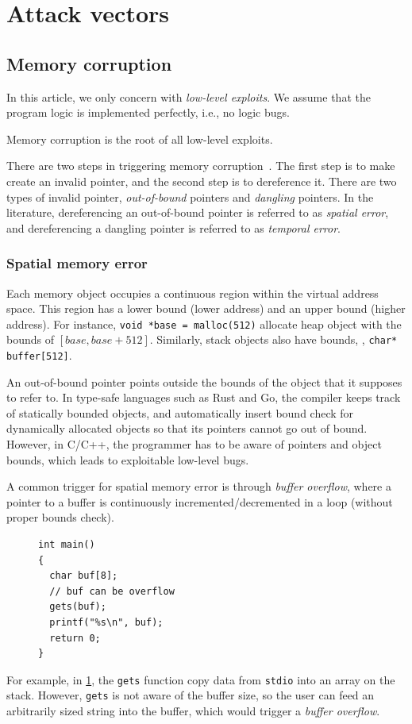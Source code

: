 \documentclass[11pt]{memoir}
\begin{document}
\section{Attack vectors}
\subsection{Memory corruption}
In this article, we only concern with \emph{low-level exploits}. 
We assume that the program logic is implemented perfectly, i.e., no logic bugs.

Memory corruption is the root of all low-level exploits.

There are two steps in triggering memory corruption~\cite{szekeres2013sok}. 
The first step is to make create an invalid pointer, and the second step is to
dereference it. There are two types of invalid pointer, \emph{out-of-bound}
pointers and \emph{dangling} pointers.
In the literature, dereferencing an out-of-bound pointer is referred to as
\emph{spatial error}, and dereferencing a dangling pointer is referred to as
\emph{temporal error}.

\subsubsection{Spatial memory error}
Each memory object occupies a continuous region within the virtual address space.
This region has a lower bound (lower address) and an upper bound (higher address). 
For instance, \texttt{void *base = malloc(512)} allocate heap object with
the bounds of $[base, base + 512]$.
Similarly, stack objects also have bounds, \eg, \texttt{char* buffer[512]}.


An out-of-bound pointer points outside the bounds of the object that it
supposes to refer to.
In type-safe languages such as Rust and Go, the compiler keeps track of
statically bounded objects, and automatically insert bound check for
dynamically allocated objects so that its pointers cannot go out of bound.
However, in C/C++, the programmer has to be aware of pointers and object
bounds, which leads to exploitable low-level bugs.


A common trigger for spatial memory error is through \emph{buffer overflow},
where a pointer to a buffer is continuously incremented/decremented in a loop
(without proper bounds check).

\begin{figure}
\begin{verbatim}
int main()
{
  char buf[8];
  // buf can be overflow
  gets(buf); 
  printf("%s\n", buf);
  return 0;
}
\end{verbatim}
\label{lst:buffer_overflow}
\end{figure}
For example, in \cref{lst:buffer_overflow}, the \texttt{gets} function copy
data from \texttt{stdio} into an array on the stack.
However, \texttt{gets} is not aware of the buffer size, so the user can feed an
arbitrarily sized string into the buffer, which would trigger a \emph{buffer
overflow}.
\end{document}
